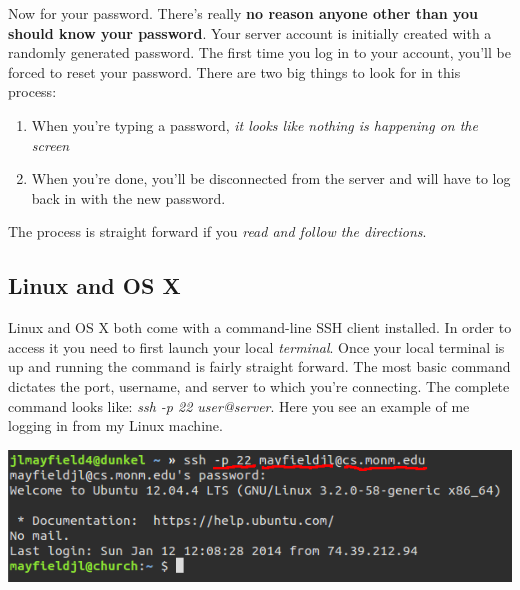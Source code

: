 \documentclass[]{tufte-handout}
\begin{document}
Now for your password. There's really \textbf{no reason anyone other than you should know your password}.  Your server account is initially created with a randomly generated password.  The first time you log in to your account, you'll be forced to reset your password. There are two big things to look for in this process:
\begin{enumerate}
\item When you're typing a password, \textit{it looks like nothing is happening on the screen}
\item When you're done, you'll be disconnected from the server and will have to log back in with the new password.
\end{enumerate}
The process is straight forward if you \textit{read and follow the directions}.

\subsection{Linux and OS X}

Linux and OS X both come with a command-line SSH client installed.  In order to access it you need to first launch your local \textit{terminal}. Once your local terminal is up and running the command is fairly straight forward. The most basic command dictates the port, username, and server to which you're connecting. The complete command looks like: \textit{ssh -p 22 user@server}.  Here you see an example of me logging in from my Linux machine.

\vspace{.1in}
\begin{center}
\includegraphics[scale=.5]{linux-sshlogin.png}
\end{center}
\vspace{.1in}
\end{document}
